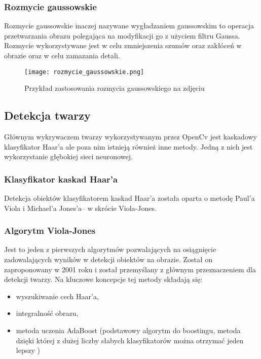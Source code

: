\subsubsection{Rozmycie gaussowskie}
Rozmycie gaussowskie inaczej nazywane wygładzaniem gaussowskim to operacja przetwarzania obrazu polegająca na modyfikacji go z użyciem filtru Gaussa. Rozmycie wykorzystywane jest w celu zmniejszenia szumów oraz zakłóceń w obrazie oraz w celu zamazania detali.
\begin{figure}[H]
	\centering
	\texttt{[image: rozmycie\_gaussowskie.png]}
	\caption{Przykład zastosowania rozmycia gaussowskiego na zdjęciu}
	\label{fig:dylatacja}
\end{figure}

\subsection{Detekcja twarzy}
Głównym wykrywaczem twarzy wykorzystywanym przez OpenCv jest kaskadowy klasyfikator Haar'a ale poza nim istnieją również inne metody. Jedną z nich jest wykorzystanie głębokiej sieci neuronowej.

\subsubsection{Klasyfikator kaskad Haar'a} \label{haar}
Detekcja obiektów klasyfikatorem kaskad Haar'a została oparta o metodę Paul'a Viola i Michael'a Jones'a– w skrócie Viola-Jones.

\subsubsection{Algorytm Viola-Jones}
Jest to jeden z pierwszych algorytmów pozwalających na osiągnięcie zadowalających wyników w detekcji obiektów na obrazie. Został on zaproponowany w 2001 roku i został przemyślany z głównym przeznaczeniem dla detekcji twarzy. Na kluczowe koncepcje tej metody składają się:
\begin{itemize}
\item wyszukiwanie cech Haar'a,
\item integralność obrazu,
\item metoda uczenia AdaBoost (podstawowy algorytm do boostingu, metoda dzięki której z dużej liczby słabych klasyfikatorów można otrzymać jeden lepszy )
\end{itemize}

